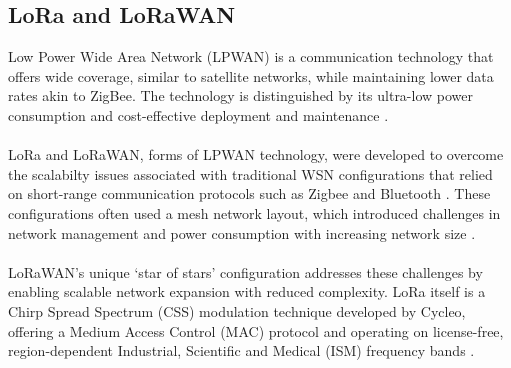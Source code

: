 \subsection{LoRa and LoRaWAN}
Low Power Wide Area Network (LPWAN) is a communication technology that offers wide coverage, similar to satellite networks, while maintaining lower data rates akin to ZigBee. The technology is distinguished by its ultra-low power consumption and cost-effective deployment and maintenance  \cite{IOTandLORAWAN-SmartFarm}.\\\\
LoRa and LoRaWAN, forms of LPWAN technology, were developed to overcome the scalabilty issues associated with traditional WSN configurations that relied on short-range communication protocols such as Zigbee and Bluetooth \cite{WSN-WaterQual}. These configurations often used a mesh network layout, which introduced challenges in network management and power consumption with increasing network size \cite{IOTandLORAWAN-SmartFarm}.\\\\
LoRaWAN's unique `star of stars' configuration addresses these challenges by enabling scalable network expansion with reduced complexity. LoRa itself is a Chirp Spread Spectrum (CSS) modulation technique developed by Cycleo, offering a Medium Access Control (MAC) protocol and operating on license-free, region-dependent Industrial, Scientific and Medical (ISM) frequency bands \cite{IOTandLORAWAN-SmartFarm}.

